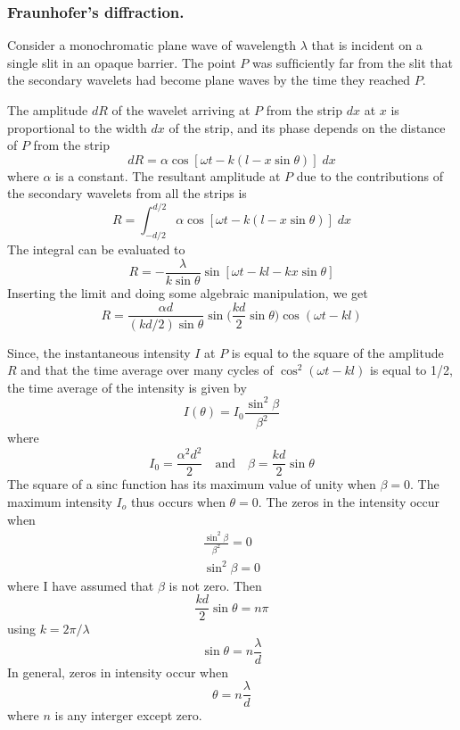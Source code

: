 \documentclass[../../../main.tex]{subfiles}
\begin{document}
\subsubsection{Fraunhofer's diffraction.} Consider a monochromatic plane wave of wavelength $\lambda$ that is incident on a single slit in an opaque barrier. The point $P$ was sufﬁciently far from the slit that the secondary wavelets had become plane waves by the time they reached $P$.

The amplitude $dR$ of the wavelet arriving at $P$ from the strip $dx$ at $x$ is proportional to the width $dx$ of the strip, and its phase depends on the distance of $P$ from the strip
\begin{equation*}
    dR=\alpha \cos[\omega t- k(l-x\sin \theta)]\;dx
\end{equation*}
where $\alpha$ is a constant. The resultant amplitude at $P$ due to the contributions of the secondary 
wavelets from all the strips is
\begin{equation*}
    R=\int_{-d/2}^{d/2}\alpha \cos[\omega t- k(l-x\sin \theta)]\;dx
\end{equation*}
The integral can be evaluated to 
\begin{equation*}
    R=-\frac{\lambda }{k\sin\theta}\sin[\omega t -k l -kx\sin\theta]
\end{equation*}
Inserting the limit and doing some algebraic manipulation, we get 
\begin{equation*}
    R=\frac{\alpha d}{(kd/2)\sin \theta}\sin \biggl(\frac{kd}{2}\sin\theta\biggr)\cos (\omega t-kl)
\end{equation*}

Since, the instantaneous intensity $I$ at $P$ is equal to the square of the amplitude $R$ and that the time average over many cycles of $\cos^2(\omega t - kl)$ is equal to 1/2, the time average of the intensity is given by
\begin{equation*}
    I(\theta)=I_0\frac{\sin^2 \beta}{\beta^2}
\end{equation*}
where 
\begin{equation*}
    I_0=\frac{\alpha^2d^2}{2}\quad\text{and}\quad\beta=\frac{kd}{2}\sin\theta
\end{equation*}
The square of a sinc function has its maximum value of unity when $\beta = 0$. The maximum intensity $I_o$ thus occurs when $\theta = 0$. The zeros in the intensity occur when
\begin{align*}
    \frac{\sin^2 \beta}{\beta^2}=0\\
    \sin^2 \beta=0
\end{align*}
where I have assumed that $\beta$ is not zero. Then 
\begin{equation*}
    \frac{kd}{2}\sin\theta=n\pi
\end{equation*}
using $k = 2\pi/\lambda$
\begin{equation*}
    \sin\theta=n\frac{\lambda}{d}
\end{equation*}
In general, zeros in intensity occur when
\begin{equation*}
    \theta=n\frac{\lambda}{d}
\end{equation*}
where $n$ is any interger except zero.
\end{document}
